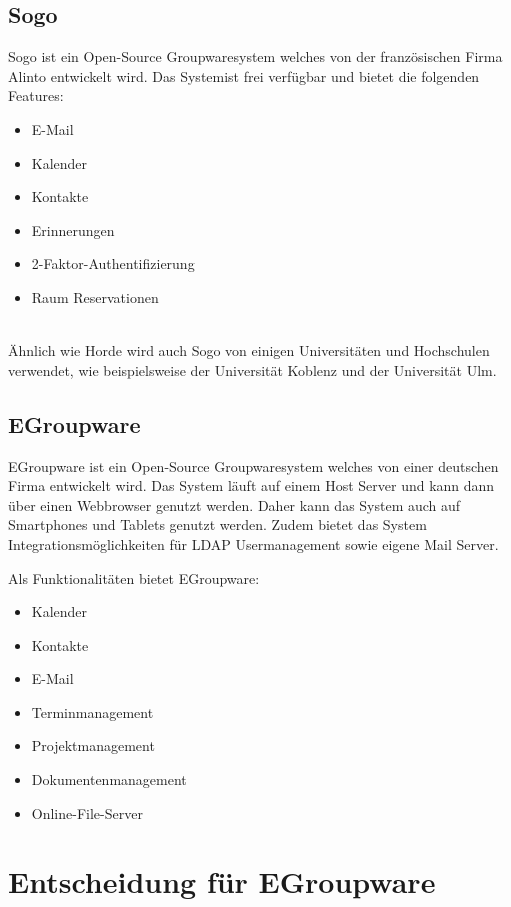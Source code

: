 \subsection{Sogo}

Sogo ist ein Open-Source Groupwaresystem welches von der französischen Firma Alinto entwickelt wird.
Das Systemist frei verfügbar und bietet die folgenden Features:

\begin{itemize}
    \item E-Mail
    \item Kalender
    \item Kontakte
    \item Erinnerungen
    \item 2-Faktor-Authentifizierung
    \item Raum Reservationen
\end{itemize}
\autocite{sogo}
\\
Ähnlich wie Horde wird auch Sogo von einigen Universitäten und Hochschulen verwendet, wie beispielsweise der Universität Koblenz und der Universität Ulm.

\subsection{EGroupware}

EGroupware ist ein Open-Source Groupwaresystem welches von einer deutschen Firma entwickelt wird.
Das System läuft auf einem Host Server und kann dann über einen Webbrowser genutzt werden.
Daher kann das System auch auf Smartphones und Tablets genutzt werden.
Zudem bietet das System Integrationsmöglichkeiten für LDAP Usermanagement sowie eigene Mail Server.

Als Funktionalitäten bietet EGroupware:

\begin{itemize}
    \item Kalender
    \item Kontakte
    \item E-Mail
    \item Terminmanagement
    \item Projektmanagement
    \item Dokumentenmanagement
    \item Online-File-Server
\end{itemize}


\section{Entscheidung für EGroupware}

